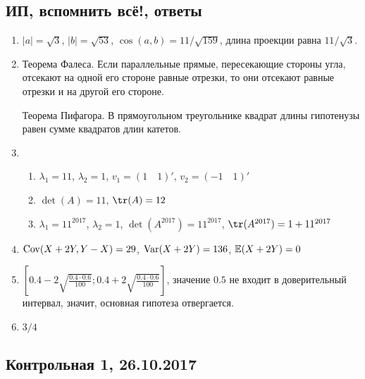 \subsection{ИП, вспомнить всё!, ответы}

\begin{enumerate}
\item $|a| = \sqrt{3}$, $|b| = \sqrt{53}$, $\cos(a,b) = 11/\sqrt{159}$,
длина проекции равна $11/\sqrt{3}$.

\item Теорема Фалеса. Если параллельные прямые, пересекающие стороны угла,
отсекают на одной его стороне равные отрезки,
то они отсекают равные отрезки и на другой его стороне.

Теорема Пифагора. В прямоугольном треугольнике квадрат длины гипотенузы
равен сумме квадратов длин катетов.

\item
\begin{enumerate}
\item $\lambda_1 = 11$, $\lambda_2 = 1$, $v_1 = (1 \quad 1)'$, $v_2 = (-1 \quad 1)'$
\item $\det(A) = 11$, $\tr(A) = 12$
\item $\lambda_1 = 11^{2017}$, $\lambda_2 = 1$, $\det(A^{2017}) = 11^{2017}$, $\tr(A^{2017}) = 1 + 11^{2017}$
\end{enumerate}

\item $\operatorname{Cov}(X+2Y, Y-X) = 29$, $\operatorname{Var}(X+2Y) = 136$, $\mathbb{E}(X+2Y) = 0$

\item $\left[0.4 - 2 \sqrt{\frac{0.4\cdot0.6}{100}}; 0.4 + 2 \sqrt{\frac{0.4\cdot0.6}{100}} \right]$,
значение $0.5$ не входит в доверительный интервал, значит, основная гипотеза отвергается.

\item $3/4$
\end{enumerate}




\subsection{Контрольная 1, 26.10.2017}








